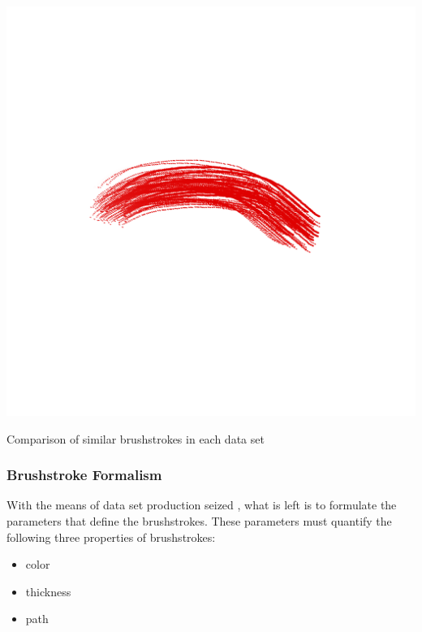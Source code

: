 \begin{marginfigure}
{        \includegraphics[width=.8\textwidth]{images/affinity_red_stroke}%
    }\qquad
    \caption[]{Comparison of similar brushstrokes in each data set}
\end{marginfigure}



\subsubsection{Brushstroke Formalism}
With the means of data set production seized , what is left is to formulate the parameters that define the brushstrokes.
These parameters must quantify the following three properties of brushstrokes:
\begin{itemize}
    \item color
    \item thickness
    \item path
\end{itemize}

